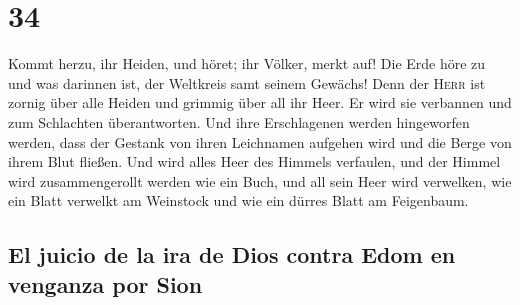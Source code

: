 \hypertarget{section-33}{%
\section{34}\label{section-33}}

 Kommt herzu, ihr Heiden, und höret; ihr Völker, merkt
auf! Die Erde höre zu und was darinnen ist, der Weltkreis samt seinem
Gewächs!  Denn der \textsc{Herr} ist zornig über alle
Heiden und grimmig über all ihr Heer. Er wird sie verbannen und zum
Schlachten überantworten.  Und ihre Erschlagenen werden
hingeworfen werden, dass der Gestank von ihren Leichnamen aufgehen wird
und die Berge von ihrem Blut fließen.  Und wird alles Heer
des Himmels verfaulen, und der Himmel wird zusammengerollt werden wie
ein Buch, und all sein Heer wird verwelken, wie ein Blatt verwelkt am
Weinstock und wie ein dürres Blatt am Feigenbaum.

\hypertarget{el-juicio-de-la-ira-de-dios-contra-edom-en-venganza-por-sion}{%
\subsection{El juicio de la ira de Dios contra Edom en venganza por
Sion}\label{el-juicio-de-la-ira-de-dios-contra-edom-en-venganza-por-sion}}

